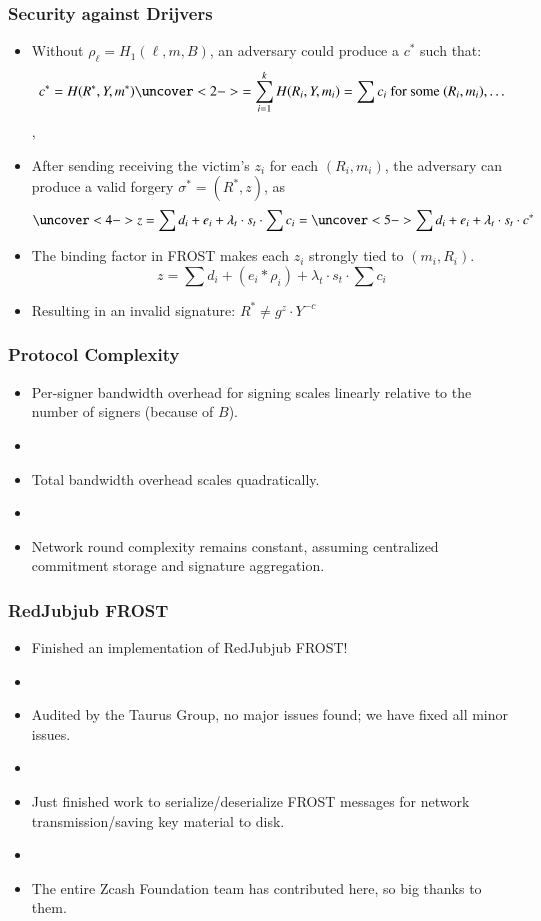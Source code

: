 \documentclass[hyperref={pdfpagelabels=true},table,dvipsnames,14pt,aspectratio=169]{beamer}
\begin{document}
\begin{frame}
  \frametitle{Security against Drijvers}
  \small

  \begin{itemize}
    \item<1->[] Without $\rho_\ell = H_1(\ell, m, B) $,
  an adversary could produce a $c^*$ such that:
      \[ c^*= H(R^*, Y, m^*) \uncover<2->{ = \sum_{i=1}^{k} H(R_i, Y, m_i)  =
      \sum c_i  \text{ for some } (R_i, m_i), \dots } \],
    \item<3->[] After sending receiving the victim's $z_i$ for each $(R_i, m_i)$, the
  adversary can produce a valid forgery $\sigma^*=(R^*, z)$, as
      \[ \uncover<4-> {z = \sum d_i + e_i + \lambda_t \cdot s_t \cdot \sum c_i} = \uncover<5->
      { \sum d_i + e_i + \lambda_t \cdot s_t \cdot c^*} \]
    \item<6->[] The binding factor in FROST makes each $z_i$ strongly tied to
      $(m_i, R_i)$.
      \[ z = \sum d_i + (e_i * \rho_i) + \lambda_t \cdot s_t \cdot \sum c_i  \]
    \item<7->[] Resulting in an invalid signature: $R^* \neq g^z \cdot Y^{-c}$
  \end{itemize}
\end{frame}

\begin{frame}
  \frametitle{Protocol Complexity}

  \begin{itemize}
    \item<1-> Per-signer bandwidth overhead for signing scales linearly
      relative to the number of signers (because of $B$).
    \item[]~
    \item<2-> Total bandwidth overhead scales quadratically.
    \item[]~
    \item<3-> Network round complexity remains constant, assuming centralized
      commitment storage and signature aggregation.
  \end{itemize}
\end{frame}


\begin{frame}
  \frametitle{RedJubjub FROST}

  \begin{itemize}
    \item<1-> Finished an implementation of RedJubjub FROST!
    \item[]
    \item<2-> Audited by the Taurus Group, no major issues found; we have fixed
      all minor issues.
    \item[]
    \item<3-> Just finished work to serialize/deserialize FROST messages for
      network transmission/saving key material to disk.
    \item[]
    \item<4-> The entire Zcash Foundation team has contributed here, so big thanks to them.
  \end{itemize}
\end{frame}
\end{document}
